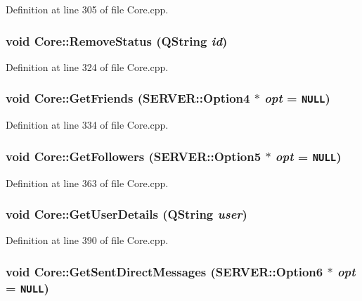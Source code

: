 Definition at line 305 of file Core.cpp.\hypertarget{classCore_d881d4987b2845589443f74fb81da766}{
\subsubsection{\setlength{\rightskip}{0pt plus 5cm}void Core::RemoveStatus (QString {\em id})}}
\label{classCore_d881d4987b2845589443f74fb81da766}




Definition at line 324 of file Core.cpp.\hypertarget{classCore_2d41bfdcb5a2dff232ee299e83a7c8e6}{
\subsubsection{\setlength{\rightskip}{0pt plus 5cm}void Core::GetFriends ({\bf SERVER::Option4} $\ast$ {\em opt} = {\tt NULL})}}
\label{classCore_2d41bfdcb5a2dff232ee299e83a7c8e6}




Definition at line 334 of file Core.cpp.\hypertarget{classCore_635c5c7bb0b6d2c2c6250ac050b466d6}{
\subsubsection{\setlength{\rightskip}{0pt plus 5cm}void Core::GetFollowers ({\bf SERVER::Option5} $\ast$ {\em opt} = {\tt NULL})}}
\label{classCore_635c5c7bb0b6d2c2c6250ac050b466d6}




Definition at line 363 of file Core.cpp.\hypertarget{classCore_572cef51b68ea351bdda246b5070c399}{
\subsubsection{\setlength{\rightskip}{0pt plus 5cm}void Core::GetUserDetails (QString {\em user})}}
\label{classCore_572cef51b68ea351bdda246b5070c399}




Definition at line 390 of file Core.cpp.\hypertarget{classCore_1b43e65adc3ba72ae2bb344bec27eb53}{
\subsubsection{\setlength{\rightskip}{0pt plus 5cm}void Core::GetSentDirectMessages ({\bf SERVER::Option6} $\ast$ {\em opt} = {\tt NULL})}}
\label{classCore_1b43e65adc3ba72ae2bb344bec27eb53}




